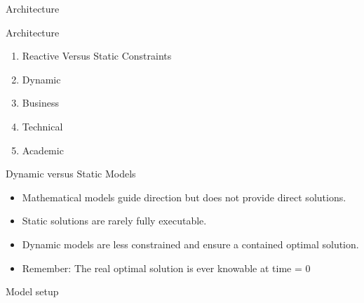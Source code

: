 \documentclass{beamer}
\begin{document}
\begin{frame}[t]{Architecture}
\end{frame}

\begin{frame}[t]{Architecture}
\end{frame}

\begin{frame}[t]{}
    \begin{block}{}
        \begin{enumerate}
			\item Reactive Versus Static Constraints
			\item Dynamic
            \item Business
            \item Technical
            \item Academic
        \end{enumerate}
    \end{block}
\end{frame}

\begin{frame}[t]{}
    \begin{block}{Dynamic versus Static Models}
			
			\drawReactiveConstraints{}

		\begin{itemize}
			\item Mathematical models guide direction but does not provide direct solutions.
			\item Static solutions are rarely fully executable.
			\item Dynamic models are less constrained and ensure a contained optimal solution.
			\item Remember: The real optimal solution is ever knowable at time = 0
		\end{itemize}
    \end{block}
\end{frame}

\begin{frame}[t]{}
    \begin{block}{}
		
    \end{block}
\end{frame}

\begin{frame}[t]{}
    \begin{block}{Model setup}
		
		\drawModelSetupHexagon[persistence=true]
    \end{block}
\end{frame}
\end{document}
